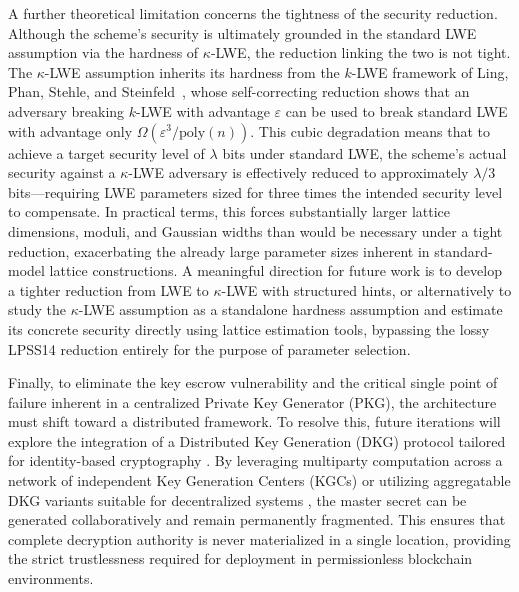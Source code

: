 A further theoretical limitation concerns the tightness of the security reduction. Although the scheme's security is ultimately grounded in the standard LWE assumption via the hardness of $\kappa$-LWE, the reduction linking the two is not tight. The $\kappa$-LWE assumption inherits its hardness from the $k$-LWE framework of Ling, Phan, Stehle, and Steinfeld~\cite{C:LPSS14}, whose self-correcting reduction shows that an adversary breaking $k$-LWE with advantage $\varepsilon$ can be used to break standard LWE with advantage only $\Omega(\varepsilon^3/\mathrm{poly}(n))$. This cubic degradation means that to achieve a target security level of $\lambda$ bits under standard LWE, the scheme's actual security against a $\kappa$-LWE adversary is effectively reduced to approximately $\lambda/3$ bits—requiring LWE parameters sized for three times the intended security level to compensate. In practical terms, this forces substantially larger lattice dimensions, moduli, and Gaussian widths than would be necessary under a tight reduction, exacerbating the already large parameter sizes inherent in standard-model lattice constructions. A meaningful direction for future work is to develop a tighter reduction from LWE to $\kappa$-LWE with structured hints, or alternatively to study the $\kappa$-LWE assumption as a standalone hardness assumption and estimate its concrete security directly using lattice estimation tools, bypassing the lossy LPSS14 reduction entirely for the purpose of parameter selection.

Finally, to eliminate the key escrow vulnerability and the critical single point of failure inherent in a centralized Private Key Generator (PKG), the architecture must shift toward a distributed framework. To resolve this, future iterations will explore the integration of a Distributed Key Generation (DKG) protocol tailored for identity-based cryptography \cite{SCN:KatGol10}. By leveraging multiparty computation across a network of independent Key Generation Centers (KGCs) or utilizing aggregatable DKG variants suitable for decentralized systems \cite{EC:GKLN21}, the master secret can be generated collaboratively and remain permanently fragmented. This ensures that complete decryption authority is never materialized in a single location, providing the strict trustlessness required for deployment in permissionless blockchain environments.